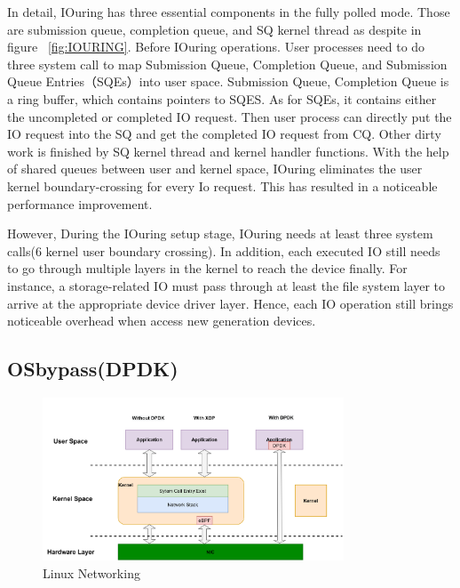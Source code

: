 In detail, IOuring has three essential components in the fully polled mode. 
Those are submission queue, completion queue, and SQ kernel thread as despite in figure ~\ref{fig:IOURING}. 
Before IOuring operations. User processes need to do three system call to map Submission Queue, 
Completion Queue, and Submission Queue Entries（SQEs）into user space. Submission Queue, Completion 
Queue is a ring buffer, which contains pointers to SQES. 
As for SQEs, it contains either the uncompleted or completed 
IO request. Then user process can directly put the IO request 
into the SQ and get the completed IO request from CQ. Other dirty 
work is finished by SQ kernel thread and kernel handler functions. 
With the help of shared queues between user and kernel space, IOuring 
eliminates the user kernel boundary-crossing for every Io request. 
This has resulted in a noticeable performance improvement.

However, During the IOuring setup stage, IOuring needs at least three system 
calls(6 kernel user boundary crossing). In addition, each executed IO still 
needs to go through multiple layers in the kernel to reach the device finally. 
For instance, a storage-related IO must pass through at least the file system 
layer to arrive at the appropriate device driver layer\cite{Yuhong}. 
Hence, each IO operation still brings noticeable overhead when access new generation devices.


\subsection{OSbypass(DPDK)}
\begin{figure}[tbp]
  \centering
  \includegraphics[width=0.8\textwidth]{images/Linux_networking}
  \caption[Short description]{Linux Networking}
  \label{fig:Linux_networking}
\end{figure}

